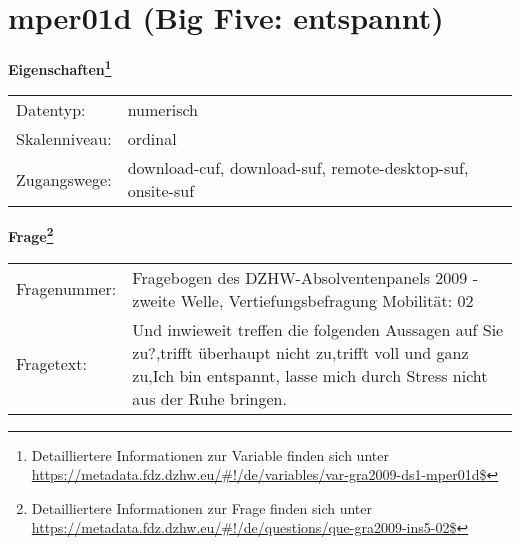 
    \setcounter{footnote}{0}

    \vspace*{-1.8cm}
	\section{mper01d (Big Five: entspannt)}
	\label{section:mper01d}



    \vspace*{0.5cm}
    \noindent\textbf{Eigenschaften\footnote{Detailliertere Informationen zur Variable finden sich unter
		\url{https://metadata.fdz.dzhw.eu/\#!/de/variables/var-gra2009-ds1-mper01d$}}}\\
	\begin{tabularx}{\hsize}{@{}lX}
	Datentyp: & numerisch \\
	Skalenniveau: & ordinal \\
	Zugangswege: &
	  download-cuf, 
	  download-suf, 
	  remote-desktop-suf, 
	  onsite-suf
 \\
    \end{tabularx}



				\vspace*{0.5cm}
                \noindent\textbf{Frage\footnote{Detailliertere Informationen zur Frage finden sich unter
		              \url{https://metadata.fdz.dzhw.eu/\#!/de/questions/que-gra2009-ins5-02$}}}\\
				\begin{tabularx}{\hsize}{@{}lX}
					Fragenummer: &
					  Fragebogen des DZHW-Absolventenpanels 2009 - zweite Welle, Vertiefungsbefragung Mobilität:
					  02
 \\
					Fragetext: & Und inwieweit treffen die folgenden Aussagen auf Sie zu?,trifft überhaupt nicht zu,trifft voll und ganz zu,Ich bin entspannt, lasse mich durch Stress nicht aus der Ruhe bringen. \\
				\end{tabularx}





